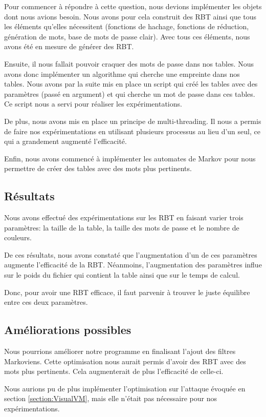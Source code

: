 \documentclass[french,12pt]{article}
\begin{document}
Pour commencer à répondre à cette question, nous devions implémenter les objets dont nous avions besoin. Nous avons pour cela construit des RBT ainsi que tous les éléments qu'elles nécessitent (fonctions de hachage, fonctions de réduction, génération de mots, base de mots de passe clair). Avec tous ces éléments, nous avons été en mesure de générer des RBT. 

Ensuite, il nous fallait pouvoir craquer des mots de passe dans nos tables. Nous avons donc implémenter un algorithme qui cherche une empreinte dans nos tables. Nous avons par la suite mis en place un script qui créé les tables avec des paramètres (passé en argument) et qui cherche un mot de passe dans ces tables. Ce script nous a servi pour réaliser les expérimentations. 

De plus, nous avons mis en place un principe de multi-threading. Il nous a permis de faire nos expérimentations en utilisant plusieurs processus au lieu d'un seul, ce qui a grandement augmenté l'efficacité. 

Enfin, nous avons commencé à implémenter les automates de Markov pour nous permettre de créer des tables avec des mots plus pertinents.

\subsection{Résultats}

Nous avons effectué des expérimentations sur les RBT en faisant varier trois paramètres: la taille de la table, la taille des mots de passe et le nombre de couleurs. 

De ces résultats, nous avons constaté que l'augmentation d'un de ces paramètres augmente l'efficacité de la RBT. Néanmoins, l'augmentation des paramètres influe sur le poids du fichier qui contient la table ainsi que sur le temps de calcul. 

Donc, pour avoir une RBT efficace, il faut parvenir à trouver le juste équilibre entre ces deux paramètres.


\subsection{Améliorations possibles}

Nous pourrions améliorer notre programme en finalisant l'ajout des filtres Markoviens. Cette optimisation nous aurait permis d'avoir des RBT avec des mots plus pertinents. Cela augmenterait de plus l'efficacité de celle-ci.

Nous aurions pu de plus implémenter l'optimisation sur l'attaque évoquée en section \ref{section:VisualVM}, mais elle n'était pas nécessaire pour nos expérimentations.




\end{document}
